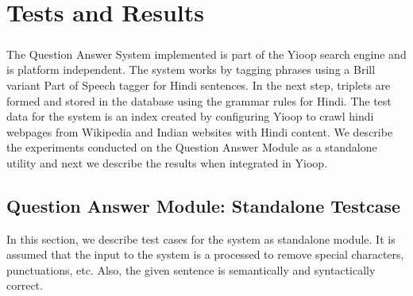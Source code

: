 \chapter{Tests and Results}

\paragraph{}
The Question Answer System implemented is part of the Yioop search engine and is platform independent. The system works by tagging phrases using a Brill variant Part of Speech tagger for Hindi sentences. In the next step, triplets are formed and stored in the database using the grammar rules for Hindi. The test data for the system is an index created by configuring Yioop to crawl hindi webpages from Wikipedia and Indian websites with Hindi content. We describe the experiments conducted on the Question Answer Module as a standalone utility and next we describe the results when integrated in Yioop.

\section {Question Answer Module: Standalone Testcase}
In this section, we describe test cases for the system as standalone module. It is assumed that the input to the system is a processed to remove special characters, punctuations, etc. Also, the given sentence is semantically and syntactically correct.

